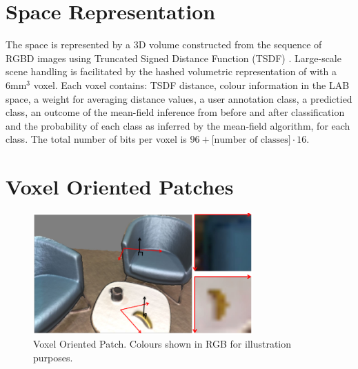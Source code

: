 \documentclass{llncs}
\begin{document}
%     
%     
%     
%     
%     
   


\section{Space Representation}
   
  The space is represented by a 3D volume constructed from the sequence of RGBD images using Truncated Signed Distance Function (TSDF) \cite{TSDF}. Large-scale scene handling is facilitated by the hashed volumetric representation of \cite{hashed_voxel} with a 6mm$^{3}$ voxel. Each voxel contains: TSDF distance, colour information in the LAB space, a weight for averaging distance values, a user annotation class, a predictied class, an outcome of the mean-field inference from before and after classification and the probability of each class as inferred by the mean-field algorithm, for each class. The total number of bits per voxel is $96 + \textrm{[number of classes]} \cdot 16$.

\section{Voxel Oriented Patches}

\begin{figure}
 \center
 \includegraphics[width=0.75\textwidth]{figures/vop}
 \caption{Voxel Oriented Patch. Colours shown in RGB for illustration purposes.}
 \label{fig:vop}
\end{figure}
\end{document}
